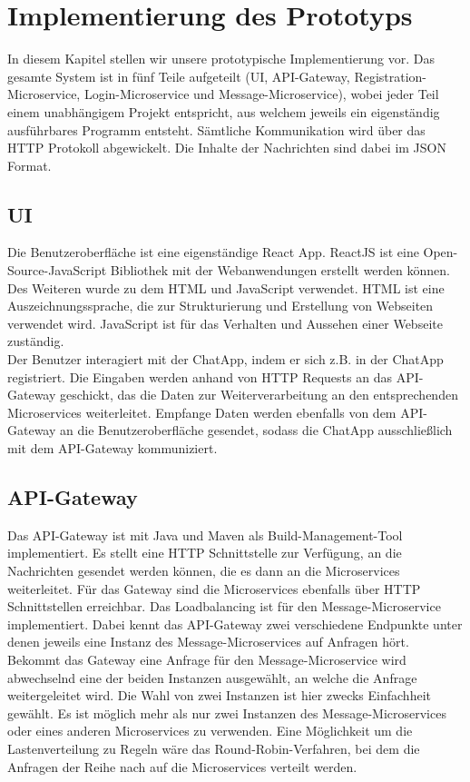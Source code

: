 \section{Implementierung des Prototyps}

In diesem Kapitel stellen wir unsere prototypische Implementierung vor. Das gesamte System ist in fünf Teile aufgeteilt (UI, API-Gateway, Registration-Microservice, Login-Microservice und Message-Microservice), wobei jeder Teil einem unabhängigem Projekt entspricht, aus welchem jeweils ein eigenständig ausführbares Programm entsteht.
Sämtliche Kommunikation wird über das HTTP Protokoll abgewickelt. Die Inhalte der Nachrichten sind dabei im JSON Format.

\subsection{UI}
Die Benutzeroberfläche ist eine eigenständige React App. ReactJS ist eine Open-Source-JavaScript Bibliothek mit der Webanwendungen erstellt werden können.\\
Des Weiteren wurde zu dem HTML und JavaScript verwendet. HTML ist eine Auszeichnungssprache, die zur Strukturierung und Erstellung von Webseiten verwendet wird. JavaScript ist für das Verhalten und Aussehen einer Webseite zuständig.\\
Der Benutzer interagiert mit der ChatApp, indem er sich z.B. in der ChatApp registriert. Die Eingaben werden anhand von HTTP Requests an das API-Gateway geschickt, das die Daten zur Weiterverarbeitung an den entsprechenden Microservices weiterleitet. Empfange Daten werden ebenfalls von dem API-Gateway an die Benutzeroberfläche gesendet, sodass die ChatApp ausschließlich mit dem API-Gateway kommuniziert.

\subsection{API-Gateway}
Das API-Gateway ist mit Java und Maven als Build-Management-Tool implementiert. Es stellt eine HTTP Schnittstelle zur Verfügung, an die Nachrichten gesendet werden können, die es dann an die Microservices weiterleitet. Für das Gateway sind die Microservices ebenfalls über HTTP Schnittstellen erreichbar.
Das Loadbalancing ist für den Message-Microservice implementiert. Dabei kennt das API-Gateway zwei verschiedene Endpunkte unter denen jeweils eine Instanz des Message-Microservices auf Anfragen hört. Bekommt das Gateway eine Anfrage für den Message-Microservice wird abwechselnd eine der beiden Instanzen ausgewählt, an welche die Anfrage weitergeleitet wird. Die Wahl von zwei Instanzen ist hier zwecks Einfachheit gewählt. Es ist möglich mehr als nur zwei Instanzen des Message-Microservices oder eines anderen Microservices zu verwenden. Eine Möglichkeit um die Lastenverteilung zu Regeln wäre das Round-Robin-Verfahren, bei dem die Anfragen der Reihe nach auf die Microservices verteilt werden.

